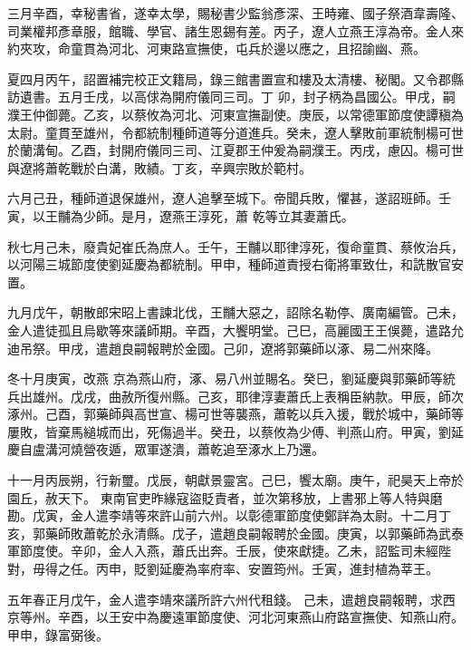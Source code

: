 \begin{pinyinscope}
 三月辛酉，幸秘書省，遂幸太學，賜秘書少監翁彥深、王時雍、國子祭酒韋壽隆、司業權邦彥章服，館職、學官、諸生恩錫有差。丙子，遼人立燕王淳為帝。金人來約夾攻，命童貫為河北、河東路宣撫使，屯兵於邊以應之，且招諭幽、燕。



 夏四月丙午，詔置補完校正文籍局，錄三館書置宣和樓及太清樓、秘閣。又令郡縣訪遺書。五月壬戌，以高俅為開府儀同三司。丁
 卯，封子柄為昌國公。甲戌，嗣濮王仲御薨。乙亥，以蔡攸為河北、河東宣撫副使。庚辰，以常德軍節度使譚稹為太尉。童貫至雄州，令都統制種師道等分道進兵。癸未，遼人擊敗前軍統制楊可世於蘭溝甸。乙酉，封開府儀同三司、江夏郡王仲爰為嗣濮王。丙戌，慮囚。楊可世與遼將蕭乾戰於白溝，敗績。丁亥，辛興宗敗於範村。



 六月己丑，種師道退保雄州，遼人追擊至城下。帝聞兵敗，懼甚，遂詔班師。壬寅，以王黼為少師。是月，遼燕王淳死，蕭
 乾等立其妻蕭氏。



 秋七月己未，廢貴妃崔氏為庶人。壬午，王黼以耶律淳死，復命童貫、蔡攸治兵，以河陽三城節度使劉延慶為都統制。甲申，種師道責授右衛將軍致仕，和詵散官安置。



 九月戊午，朝散郎宋昭上書諫北伐，王黼大惡之，詔除名勒停、廣南編管。己未，金人遣徒孤且烏歇等來議師期。辛酉，大饗明堂。己巳，高麗國王王俁薨，遣路允迪吊祭。甲戌，遣趙良嗣報聘於金國。己卯，遼將郭藥師以涿、易二州來降。



 冬十月庚寅，改燕
 京為燕山府，涿、易八州並賜名。癸巳，劉延慶與郭藥師等統兵出雄州。戊戌，曲赦所復州縣。己亥，耶律淳妻蕭氏上表稱臣納款。甲辰，師次涿州。己酉，郭藥師與高世宣、楊可世等襲燕，蕭乾以兵入援，戰於城中，藥師等屢敗，皆棄馬縋城而出，死傷過半。癸丑，以蔡攸為少傅、判燕山府。甲寅，劉延慶自盧溝河燒營夜遁，眾軍遂潰，蕭乾追至涿水上乃還。



 十一月丙辰朔，行新璽。戊辰，朝獻景靈宮。己巳，饗太廟。庚午，祀昊天上帝於園丘，赦天下。
 東南官吏昨緣寇盜貶責者，並次第移放，上書邪上等人特與磨勘。戊寅，金人遣李靖等來許山前六州。以彰德軍節度使鄭詳為太尉。十二月丁亥，郭藥師敗蕭乾於永清縣。戊子，遣趙良嗣報聘於金國。庚寅，以郭藥師為武泰軍節度使。辛卯，金人入燕，蕭氏出奔。壬辰，使來獻捷。乙未，詔監司未經陛對，毋得之任。丙申，貶劉延慶為率府率、安置筠州。壬寅，進封植為莘王。



 五年春正月戊午，金人遣李靖來議所許六州代租錢。
 己未，遣趙良嗣報聘，求西京等州。辛酉，以王安中為慶遠軍節度使、河北河東燕山府路宣撫使、知燕山府。甲申，錄富弼後。




\end{pinyinscope}
